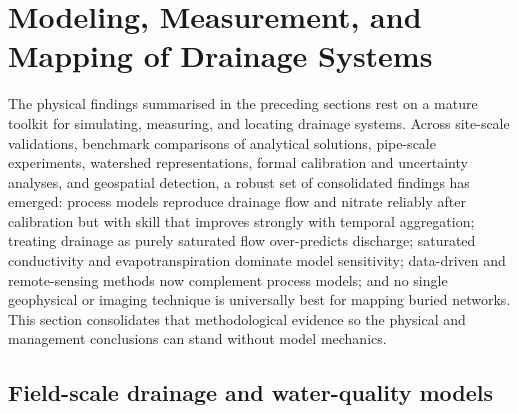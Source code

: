 \section{Modeling, Measurement, and Mapping of Drainage Systems}

The physical findings summarised in the preceding sections rest on a mature
toolkit for simulating, measuring, and locating drainage systems. Across
site-scale validations, benchmark comparisons of analytical solutions,
pipe-scale experiments, watershed representations, formal calibration and
uncertainty analyses, and geospatial detection, a robust set of consolidated
findings has emerged: process models reproduce drainage flow and nitrate
reliably after calibration but with skill that improves strongly with temporal
aggregation; treating drainage as purely saturated flow over-predicts
discharge; saturated conductivity and evapotranspiration dominate model
sensitivity; data-driven and remote-sensing methods now complement process
models; and no single geophysical or imaging technique is universally best for
mapping buried networks. This section consolidates that methodological
evidence so the physical and management conclusions can stand without model
mechanics.

\subsection{Field-scale drainage and water-quality models}


